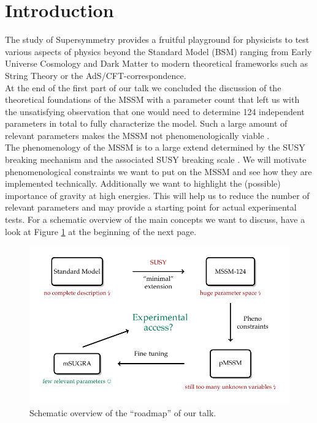 \section{Introduction}
The study of Supersymmetry provides a fruitful playground for physicists to test various aspects of  physics beyond the Standard Model (BSM) ranging from Early Universe Cosmology and Dark Matter to modern theoretical frameworks such as String Theory or the AdS/CFT-correspondence.\\
At the end of the first part of our talk we concluded the discussion of the theoretical foundations of the MSSM with a parameter count that left us with the unsatisfying observation that one would need to determine 124 independent parameters in total to fully characterize the model. Such a large amount of relevant parameters makes the MSSM not phenomenologically viable \cite{MSSMGroup1998}.\\
The phenomenology of the MSSM is to a large extend determined by the SUSY breaking mechanism and the associated SUSY breaking scale \cite{PDG20182019}. We will motivate phenomenological constraints we want to put on the MSSM and see how they are implemented technically. Additionally we want to highlight the (possible) importance of gravity at high energies. This will help us to reduce the number of relevant parameters and may provide a starting point for actual experimental tests. For a schematic overview of the main concepts we want to discuss, have a look at Figure \ref{fig:roadmap} at the beginning of the next page.

\begin{figure}[t]
\centering
\includegraphics{figures/overview}
\caption{Schematic overview of the \enquote{roadmap} of our talk.}
\label{fig:roadmap}
\end{figure}
\newpage
